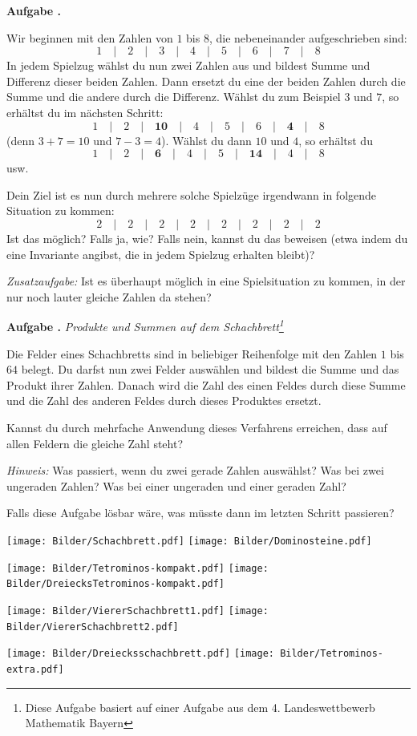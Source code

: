 \documentclass[a4paper,ngerman,12pt]{scrartcl}
\theoremstyle{definition}
\theoremstyle{plain}
\theoremstyle{remark}
\newlength{\aufgabenskip}
\newcounter{aufgabennummer}
\newenvironment{aufgabe}[1]{
	\addtocounter{aufgabennummer}{1}
	\textbf{Aufgabe \theaufgabennummer.} \emph{#1} \par
}{\vspace{\aufgabenskip}}
\begin{document}
\begin{aufgabe}{}
	Wir beginnen mit den Zahlen von $1$ bis $8$, die nebeneinander aufgeschrieben sind:
		\[1 \quad\vert\quad 2 \quad\vert\quad 3 \quad\vert\quad 4 \quad\vert\quad 5 \quad\vert\quad 6 \quad\vert\quad 7 \quad\vert\quad 8\]
	In jedem Spielzug wählst du nun zwei Zahlen aus und bildest Summe und Differenz dieser beiden Zahlen. Dann ersetzt du eine der beiden Zahlen durch die Summe und die andere durch die Differenz. Wählst du zum Beispiel $3$ und $7$, so erhältst du im nächsten Schritt:
		\[1 \quad\vert\quad 2 \quad\vert\quad \mathbf{10} \quad\vert\quad 4 \quad\vert\quad 5 \quad\vert\quad 6 \quad\vert\quad \mathbf{4} \quad\vert\quad 8\]
	(denn $3+7=10$ und $7-3=4$). Wählst du dann $10$ und $4$, so erhältst du
		\[1 \quad\vert\quad 2 \quad\vert\quad \mathbf{6} \quad\vert\quad 4 \quad\vert\quad 5 \quad\vert\quad \mathbf{14} \quad\vert\quad 4 \quad\vert\quad 8\]
	usw.
	
	Dein Ziel ist es nun durch mehrere solche Spielzüge irgendwann in folgende Situation zu kommen:
		\[2 \quad\vert\quad 2 \quad\vert\quad 2 \quad\vert\quad 2 \quad\vert\quad 2 \quad\vert\quad 2 \quad\vert\quad 2 \quad\vert\quad 2\]		
	Ist das möglich? Falls ja, wie? Falls nein, kannst du das beweisen (etwa indem du eine Invariante angibst, die in jedem Spielzug erhalten bleibt)?
	
	\emph{Zusatzaufgabe:} Ist es überhaupt möglich in eine Spielsituation zu kommen, in der nur noch lauter gleiche Zahlen da stehen?
\end{aufgabe}

\begin{aufgabe}{Produkte und Summen auf dem Schachbrett\footnote{Diese Aufgabe basiert auf einer Aufgabe aus dem 4. Landeswettbewerb Mathematik Bayern}}
	Die Felder eines Schachbretts sind in beliebiger Reihenfolge mit den Zahlen $1$ bis $64$ belegt. Du darfst nun zwei Felder auswählen und bildest die Summe und das Produkt ihrer Zahlen. Danach wird die Zahl des einen Feldes durch diese Summe und die Zahl des anderen Feldes durch dieses Produktes ersetzt. 
	
	Kannst du durch mehrfache Anwendung dieses Verfahrens erreichen, dass auf allen Feldern die gleiche Zahl steht?
	
	\emph{Hinweis:} Was passiert, wenn du zwei gerade Zahlen auswählst? Was bei zwei ungeraden Zahlen? Was bei einer ungeraden und einer geraden Zahl?
	
	Falls diese Aufgabe lösbar wäre, was müsste dann im letzten Schritt passieren?
\end{aufgabe}

\newpage

\texttt{[image: Bilder/Schachbrett.pdf]}
\texttt{[image: Bilder/Dominosteine.pdf]}

\texttt{[image: Bilder/Tetrominos-kompakt.pdf]}
\texttt{[image: Bilder/DreiecksTetrominos-kompakt.pdf]}

\texttt{[image: Bilder/ViererSchachbrett1.pdf]}
\texttt{[image: Bilder/ViererSchachbrett2.pdf]}

\texttt{[image: Bilder/Dreiecksschachbrett.pdf]}
\texttt{[image: Bilder/Tetrominos-extra.pdf]}
\end{document}
